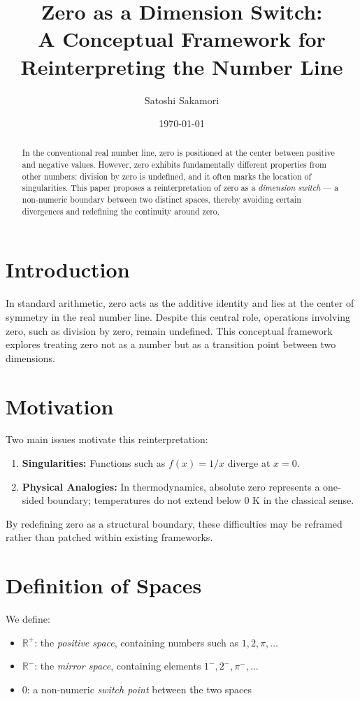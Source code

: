 \documentclass[12pt,a4paper]{article}
\title{Zero as a Dimension Switch:\\
A Conceptual Framework for Reinterpreting the Number Line}
\author{Satoshi Sakamori}
\date{\today}
\begin{document}
\maketitle

\begin{abstract}
In the conventional real number line, zero is positioned at the center between positive and negative values. 
However, zero exhibits fundamentally different properties from other numbers: division by zero is undefined, and it often marks the location of singularities. 
This paper proposes a reinterpretation of zero as a \emph{dimension switch} --- a non-numeric boundary between two distinct spaces, thereby avoiding certain divergences and redefining the continuity around zero.
\end{abstract}

\section{Introduction}
In standard arithmetic, zero acts as the additive identity and lies at the center of symmetry in the real number line. 
Despite this central role, operations involving zero, such as division by zero, remain undefined. 
This conceptual framework explores treating zero not as a number but as a transition point between two dimensions.

\section{Motivation}
Two main issues motivate this reinterpretation:
\begin{enumerate}
    \item \textbf{Singularities:} Functions such as $f(x) = 1/x$ diverge at $x = 0$.
    \item \textbf{Physical Analogies:} In thermodynamics, absolute zero represents a one-sided boundary; temperatures do not extend below $0$ K in the classical sense.
\end{enumerate}
By redefining zero as a structural boundary, these difficulties may be reframed rather than patched within existing frameworks.

\section{Definition of Spaces}
We define:
\begin{itemize}
    \item $\mathbb{R}^+$: the \emph{positive space}, containing numbers such as $1, 2, \pi, \dots$
    \item $\mathbb{R}^-$: the \emph{mirror space}, containing elements $1^{-}, 2^{-}, \pi^{-}, \dots$
    \item $0$: a non-numeric \emph{switch point} between the two spaces
\end{itemize}
\end{document}
